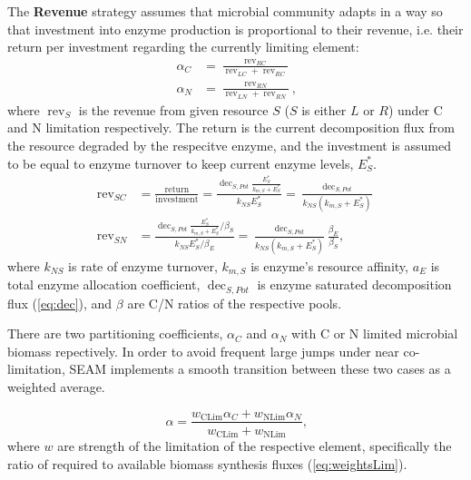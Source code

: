 The \textbf{Revenue} strategy assumes that microbial community adapts in a way
so that investment into enzyme production is proportional to their revenue, i.e.
their return per investment regarding the currently limiting element: 
\begin{subequations}
\label{eq:allocRev}
\begin{align}
\alpha_C &= \frac{\operatorname{rev}_{RC}}{\operatorname{rev}_{LC} + \operatorname{rev}_{RC}} 
\\
\alpha_N &= \frac{\operatorname{rev}_{RN}}{\operatorname{rev}_{LN} + \operatorname{rev}_{RN}} 
\text{,} 
\end{align}
\end{subequations}
where $\operatorname{rev}_S$ is the revenue from given resource $S$ ($S$ is
either $L$ or $R$) under C and N limitation respectively. The return is the
current decomposition flux from the resource degraded by the respecitve enzyme, and the investment is assumed to be
equal to enzyme turnover to keep current enzyme levels, $E_S^*$.
\begin{subequations}
\label{eq:allocRev2}
\begin{align}
\operatorname{rev}_{SC} &= \frac{\text{return}}{\text{investment}} 
= \frac{\operatorname{dec}_{S,Pot} \frac{E_S^*}{k_{m,S} + E_S^*}} {k_{NS}E_S^*} 
= \frac{\operatorname{dec}_{S,Pot}} {k_{NS}(k_{m,S} + E_S^*)} \\ 
\operatorname{rev}_{SN} &= \frac{\operatorname{dec}_{S,Pot}
\frac{E_S^*}{k_{m,S} + E_S^*} / \beta_S} {k_{NS} E_S^* / \beta_E} 
= \frac{\operatorname{dec}_{S,Pot}}{k_{NS} (k_{m,S} + E_S^*)} 
\frac{\beta_E}{\beta_S}
\text{,} 
\end{align}
\end{subequations}
where $k_{NS}$ is rate of enzyme turnover, $k_{m,S}$ is enzyme's resource
affinity, $a_E$ is total enzyme allocation coefficient, $\operatorname{dec}_{S,Pot}$ is
enzyme saturated decomposition flux (\ref{eq:dec}), and $\beta$ are C/N ratios
of the respective pools.

There are two partitioning coefficients, $\alpha_C$ and $\alpha_N$ with C or N
limited microbial biomass repectively. In order to avoid frequent large jumps
under near co-limitation, SEAM implements a smooth transition between these two
cases as a weighted average.

\begin{equation}
\label{eq:allocRev3}
\alpha = \frac{w_{\operatorname{CLim}} \alpha_C + w_{\operatorname{NLim}}
\alpha_N}{w_{\operatorname{CLim}}  + w_{\operatorname{NLim}} } 
\text{,} 
\end{equation}
where $w$ are strength of the limitation of the respective element, specifically
the ratio of required to available biomass synthesis fluxes
(\ref{eq:weightsLim}).


